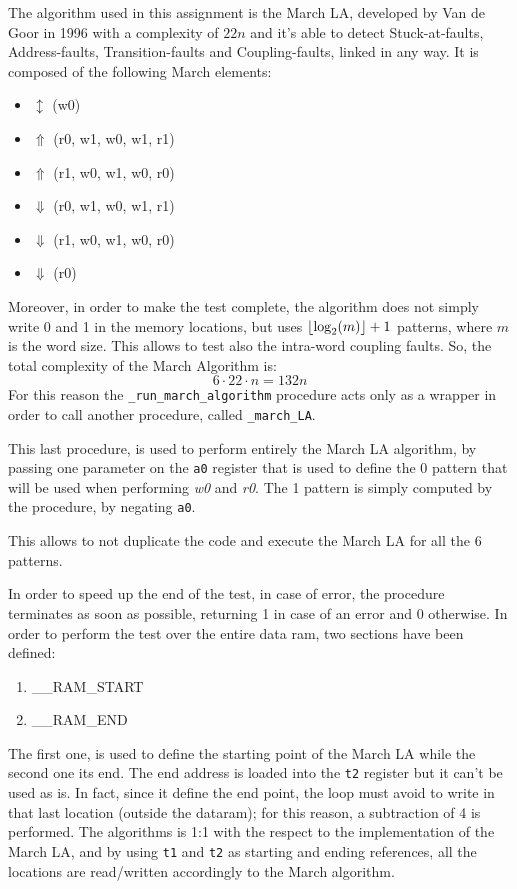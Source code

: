 \documentclass[paper=a4, fontsize=10pt]{scrartcl}	%
\DeclarePairedDelimiter\floor{\lfloor}{\rfloor}
\begin{document}
	The algorithm used in this assignment is the March LA, developed by Van de Goor in 1996 with a complexity of $22n$ and it's able to detect Stuck-at-faults, Address-faults, Transition-faults and Coupling-faults, linked in any way. It is composed of the following March elements:
	\begin{itemize}
		\itemsep0sp
		\item $\updownarrow$ (w0)
		\item $\Uparrow$ (r0, w1, w0, w1, r1)
		\item $\Uparrow$ (r1, w0, w1, w0, r0)
		\item $\Downarrow$ (r0, w1, w0, w1, r1)
		\item $\Downarrow$ (r1, w0, w1, w0, r0)
		\item $\Downarrow$ (r0)
	\end{itemize}
	Moreover, in order to make the test complete, the algorithm does not simply write 0 and 1 in the memory locations, but uses $ \floor*{\log_2(m)} + 1$ patterns, where $m$ is the word size. This allows to test also the intra-word coupling faults. So, the total complexity of the March Algorithm is:
	\[
		6 \cdot 22 \cdot n = 132n
	\]
	For this reason the \texttt{\_run\_march\_algorithm} procedure acts only as a wrapper in order to call another procedure, called \texttt{\_march\_LA}.
	
	This last procedure, is used to perform entirely the March LA algorithm, by passing one parameter on the \texttt{a0} register that is used to define the 0 pattern that will be used when performing \textit{w0} and \textit{r0}. The 1 pattern is simply computed by the procedure, by negating \texttt{a0}.
	
	This allows to not duplicate the code and execute the March LA for all the 6 patterns. 
	
	In order to speed up the end of the test, in case of error, the procedure terminates as soon as possible, returning 1 in case of an error and 0 otherwise.\newline\newline
	In order to perform the test over the entire data ram, two sections have been defined:
	\begin{enumerate}
		\itemsep0sp
		\item \_\_RAM\_START
		\item \_\_RAM\_END
	\end{enumerate}
	The first one, is used to define the starting point of the March LA while the second one its end. The end address is loaded into the \texttt{t2} register but it can't be used as is. In fact, since it define the end point, the loop must avoid to write in that last location (outside the dataram); for this reason, a subtraction of 4 is performed.
	The algorithms is 1:1 with the respect to the implementation of the March LA, and by using \texttt{t1} and \texttt{t2} as starting and ending references, all the locations are read/written accordingly to the March algorithm.
	
\end{document}
